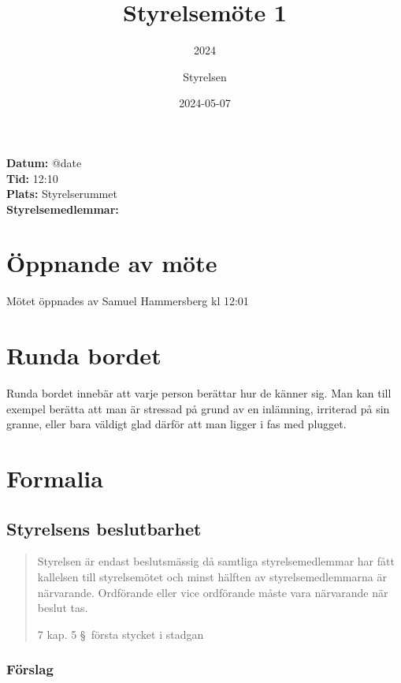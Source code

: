 \documentclass[protokoll]{dvd}
\begin{document}
\title{Styrelsemöte 1}
\subtitle{2024}
\author{Styrelsen}
\date{2024-05-07}


\textbf{Datum:} \csname @date\endcsname\\
\textbf{Tid:} 12:10\\
\textbf{Plats:} Styrelserummet\\
\textbf{Styrelsemedlemmar:}
\begin{närvarande_förtroendevalda}
\end{närvarande_förtroendevalda}

\section{Öppnande av möte}

Mötet öppnades av Samuel Hammersberg kl 12:01

\section{Runda bordet}

Runda bordet innebär att varje person berättar hur de känner sig.
Man kan till exempel berätta att man är stressad på grund av en inlämning, irriterad på sin granne, eller bara väldigt glad därför att man ligger i fas med plugget.

\section{Formalia}

\subsection{Styrelsens beslutbarhet}

\blockquote[7 kap. 5 \S~första stycket i stadgan][]{%
    Styrelsen är endast beslutsmässig då samtliga styrelsemedlemmar har fått kallelsen till styrelsemötet och minst hälften av styrelsemedlemmarna är närvarande.
    Ordförande eller vice ordförande måste vara närvarande när beslut tas.
}

\subsubsection*{Förslag}
\end{document}
